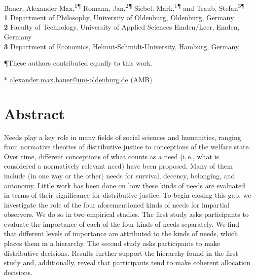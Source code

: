\documentclass[10pt,letterpaper]{article}
\begin{document}
\vspace*{0.2in}


\begin{flushleft}
{\Large
\textbf{}
}
\newline
\\
Bauer, Alexander Max,\textsuperscript{1\P*}
Romann, Jan,\textsuperscript{2\P}
Siebel, Mark,\textsuperscript{1\P}
and Traub, Stefan\textsuperscript{3\P}
\\
\bigskip
\textbf{1} Department of Philosophy, University of Oldenburg, Oldenburg, Germany
\\
\textbf{2} Faculty of Technology, University of Applied Sciences Emden/Leer, Emden, Germany
\\
\textbf{3} Department of Economics, Helmut-Schmidt-University, Hamburg, Germany
\\
\bigskip

\P These authors contributed equally to this work.

* \href{mailto:alexander.max.bauer@uni-oldenburg.de}{alexander.max.bauer@uni-oldenburg.de} (AMB)
\end{flushleft}


\section*{Abstract}
Needs play a key role in many fields of social sciences and humanities, ranging from normative theories of distributive justice to conceptions of the welfare state.
Over time, different conceptions of what counts as a need (i.\,e., what is considered a normatively relevant need) have been proposed.
Many of them include (in one way or the other) needs for survival, decency, belonging, and autonomy.
Little work has been done on how these kinds of needs are evaluated in terms of their significance for distributive justice.
To begin closing this gap, we investigate the role of the four aforementioned kinds of needs for impartial observers.
We do so in two empirical studies.
The first study asks participants to evaluate the importance of each of the four kinds of needs separately.
We find that different levels of importance are attributed to the kinds of needs, which places them in a hierarchy.
The second study asks participants to make distributive decisions.
Results further support the hierarchy found in the first study and, additionally, reveal that participants tend to make coherent allocation decisions.
\end{document}
